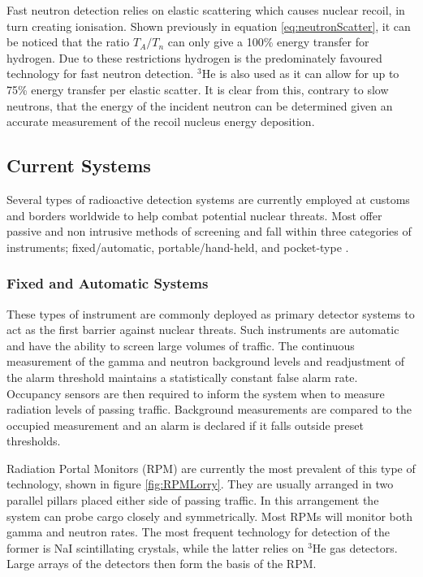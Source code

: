 Fast neutron detection relies on elastic scattering which causes nuclear recoil, in turn creating ionisation. Shown previously in equation \ref{eq:neutronScatter}, it can be noticed that the ratio $T_{A}/T_{n}$ can only give a 100\% energy transfer for hydrogen. Due to these restrictions hydrogen is the predominately favoured technology for fast neutron detection. $^{3}$He is also used as it can allow for up to 75\% energy transfer per elastic scatter. It is clear from this, contrary to slow neutrons, that the energy of the incident neutron can be determined given an accurate measurement of the recoil nucleus energy deposition.

\subsection{Current Systems}
Several types of radioactive detection systems are currently employed at customs and borders worldwide to help combat potential nuclear threats. Most offer passive and non intrusive methods of screening and fall within three categories of instruments; fixed/automatic, portable/hand-held, and pocket-type \cite{modesIAEABorder}.

\subsubsection{Fixed and Automatic Systems}
These types of instrument are commonly deployed as primary detector systems to act as the first barrier against nuclear threats. Such instruments are automatic and have the ability to screen large volumes of traffic. The continuous measurement of the gamma and neutron background levels and readjustment of the alarm threshold maintains a statistically constant false alarm rate. Occupancy sensors are then required to inform the system when to measure radiation levels of passing traffic. Background measurements are compared to the occupied measurement and an alarm is declared if it falls outside preset thresholds. 

Radiation Portal Monitors (RPM) are currently the most prevalent of this type of technology, shown in figure \ref{fig:RPMLorry}. They are usually arranged in two parallel pillars placed either side of passing traffic. In this arrangement the system can probe cargo closely and symmetrically. Most RPMs will monitor both gamma and neutron rates. The most frequent technology for detection of the former is NaI scintillating crystals, while the latter relies on $^{3}$He gas detectors. Large arrays of the detectors then form the basis of the RPM.

